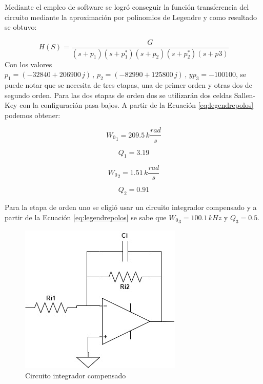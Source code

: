 \documentclass[11pt, a4paper]{article}
\begin{document}
	Mediante el empleo de software se logró conseguir la función transferencia del circuito mediante la aproximación por polinomios de Legendre y como resultado se obtuvo:
	
\begin{equation}
	H(S) = \dfrac{G}{(s+p_1)(s+p_1^*)(s+p_2)(s+p_2^*)(s+p3)}
\label{eq:legendrepolos}
\end{equation}
	Con los valores $p_1 = (-32840 + 206900 \, j ) \, , \, p_2 = (-82990 + 125800 \, j) \, , \, y p_3 = -100100$, se puede notar que se necesita de tres etapas, una de primer orden y otras dos de segundo orden.
	Para las dos etapas de orden dos se utilizarán dos celdas Sallen-Key con la configuración pasa-bajos. A partir de la Ecuación \ref{eq:legendrepolos} podemos obtener:
	
\begin{equation}
{W_0}_1 = 209.5 \, k \frac{rad}{s}
\label{eq:wo1Legendre}
\end{equation}

\begin{equation}
Q_1 = 3.19
\label{eq:Q1Legendre}
\end{equation}

\begin{equation}
{W_0}_2 = 1.51 \, k \frac{rad}{s}
\label{eq:wo2Legendre}
\end{equation}

\begin{equation}
Q_2 = 0.91
\label{eq:Q2Legendre}
\end{equation}

	Para la etapa de orden uno se eligió usar un circuito integrador compensado y a partir de la Ecuación \eqref{eq:legendrepolos} se sabe que ${W_0}_3 = 100.1 \, kHz$ y $Q_3 = 0.5$.
	
\begin{figure}[H]
	\centering
	\includegraphics[scale=0.5]{integradorcompensado.jpg}
	\caption{Circuito integrador compensado}
	\label{fig:sallenkeypasabajos}
\end{figure}
	
\end{document}
